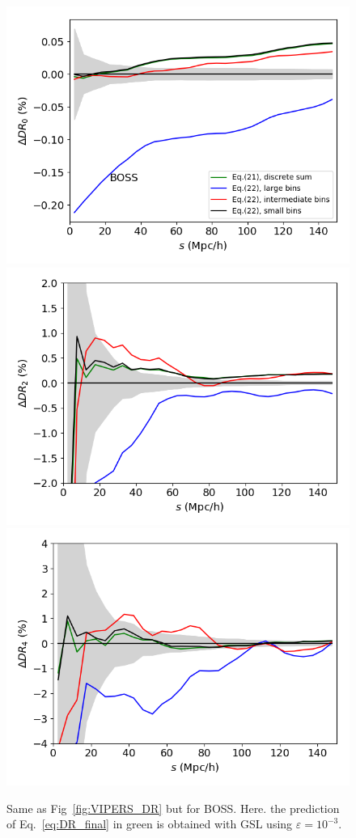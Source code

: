 \documentclass{aa}
\begin{document}
\begin{figure}
\includegraphics[width=0.96\columnwidth]{Figures/reldif_DR_randoms_boss_map_nside8192_nside8192_N_30000000_1e-5_l0} 
\includegraphics[width=0.96\columnwidth]{Figures/reldif_DR_randoms_boss_map_nside8192_nside8192_N_30000000_1e-5_l2} 
\includegraphics[width=0.96\columnwidth]{Figures/reldif_DR_randoms_boss_map_nside8192_nside8192_N_30000000_1e-5_l4} 
    \caption{Same as Fig~\ref{fig:VIPERS_DR} but for BOSS. Here. the prediction of Eq.~\eqref{eq:DR_final} in green is obtained with GSL using $\varepsilon = 10^{-3}$.}
    \label{fig:BOSS_DR}
\end{figure}
\end{document}
